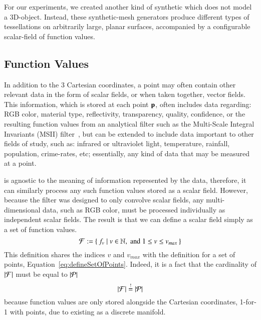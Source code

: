For our experiments, we created another kind of synthetic \tdd{} which does not model a 3D-object. Instead, these synthetic-mesh generators produce different types of tessellations on arbitrarily large, planar surfaces, accompanied by a configurable scalar-field of function values.
%
\subsection{Function Values}
\label{ch2s3ssFV}
In addition to the 3 Cartesian coordinates, a point may often contain other relevant data in the form of scalar fields, or when taken together, vector fields. This information, which is stored at each point $\mathbf{p}$, often includes data regarding: RGB color, material type, reflectivity, transparency, quality, confidence, or the resulting function values from an analytical filter such as the Multi-Scale Integral Invariants (MSII) filter~\cite[p.~21]{Mara12}, but can be extended to include data important to other fields of study, such as: infrared or ultraviolet light, temperature, rainfall, population, crime-rates, etc; essentially, any kind of data that may be measured at a point. 

 is agnostic to the meaning of information represented by the data, therefore, it can similarly process any such function values stored as a scalar field. However, because the filter was designed to only convolve scalar fields, any multi-dimensional data, such as RGB color, must be processed individually as independent scalar fields. The result is that we can define a scalar field simply as a set of function values.
%
\begin{equation}
	\mathcal{F} := \left \{\: f_v \mid v \in \mathbb{N}, \;\text{and}\; 1\leq v \leq v_{max} \:\right \}
	\label{eq:defineSetOfFunctionValues}
\end{equation}%
%
%
%
This definition shares the indices $v$ and $v_{max}$ with the definition for a set of points, Equation~\ref{eq:defineSetOfPoints}. Indeed, it is a fact that the cardinality of $|\mathcal{F}|$ must be equal to $|\mathcal{P}|$
\begin{equation}
	|\mathcal{F}| \overset{!}{=} |\mathcal{P}|
\end{equation}
because function values are only stored alongside the Cartesian coordinates, 1-for-1 with points, due to \tdd{} existing as a discrete manifold.
%
%
%
%
%
